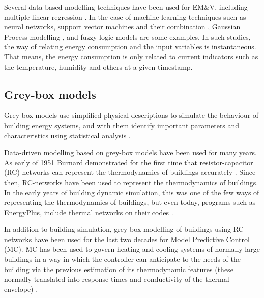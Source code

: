 \documentclass[10pt, conference, compsocconf]{IEEEtran}
\begin{document}
Several data-based modelling techniques have been used for EM\&V, including multiple linear regression \cite{braun2014using}.  %
In the case of machine learning techniques such as neural networks, support vector machines and their combination \cite{ahmad2014review}, Gaussian Process modelling \cite{heo2012gaussian}, and fuzzy logic models \cite{ciabattoni2014fuzzy} are some examples. In such studies, the way of relating energy consumption and the input variables is instantaneous. That means, the energy consumption is only related to current indicators such as the temperature, humidity and others at a given timestamp.
  

\subsection{Grey-box models}

Grey-box models use simplified physical descriptions to simulate the behaviour of building energy systems, and with them identify important parameters and characteristics using statistical analysis \cite{handbook2017american}.

Data-driven modelling based on grey-box models have been used for many years. As early of 1951 Burnard demonstrated for the first time that resistor-capacitor (RC) networks can represent the thermodynamics of buildings accurately \cite{burnand1952study}. Since then, RC-networks have been used to represent the thermodynamics of buildings. In the early years of building dynamic simulation, this was one of the few ways of representing the thermodynamics of buildings, but even today, programs such as EnergyPlus, include thermal networks on their codes \cite{handbook2017american} .

In addition to building simulation, grey-box modelling of buildings using RC-networks have been used for the last two decades for Model Predictive Control (MC). MC has been used to govern heating and cooling systems of normally large buildings in a way in which the controller can anticipate to the needs of the building via the previous estimation of its thermodynamic features (these normally translated into response times and conductivity of the thermal envelope) \cite{coley1992second}.
\end{document}
